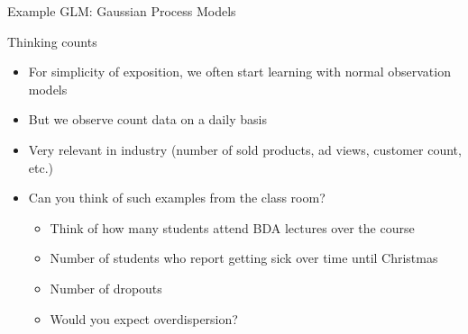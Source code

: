 \documentclass[finnish,english,t]{beamer}
\begin{document}
\begin{frame}{Example GLM: Gaussian Process Models}
  
\end{frame}

\begin{frame}{Thinking counts}
    \begin{itemize}
        \item For simplicity of exposition, we often start learning with normal observation models
        \item But we observe count data on a daily basis
        \item Very relevant in industry (number of sold products, ad views, customer count, etc.)
        \item Can you think of such examples from the class room? 
        \begin{itemize}
            \item Think of how many students attend BDA lectures over the course
            \item Number of students who report getting sick over time until Christmas
            \item Number of dropouts
            \item Would you expect overdispersion? 
        \end{itemize}
        
    \end{itemize}
\end{frame}
\end{document}

